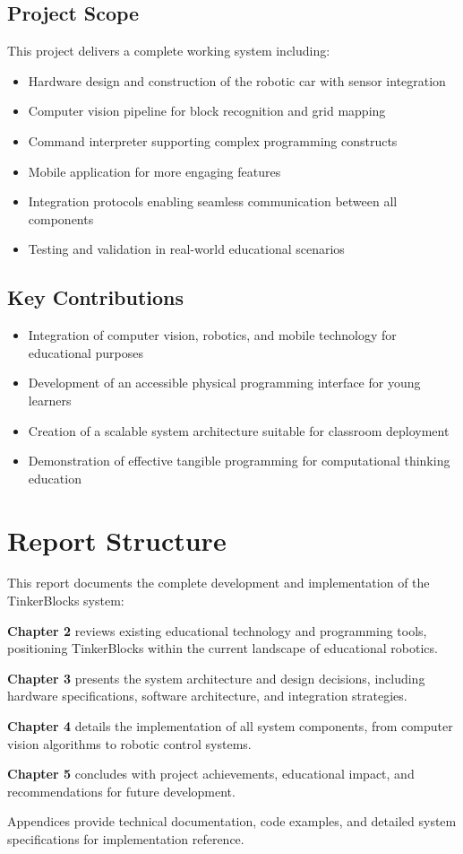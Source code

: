\subsection{Project Scope}
This project delivers a complete working system including:
\begin{itemize}
    \item Hardware design and construction of the robotic car with sensor integration
    \item Computer vision pipeline for block recognition and grid mapping
    \item Command interpreter supporting complex programming constructs
    \item Mobile application for more engaging features
    \item Integration protocols enabling seamless communication between all components
    \item Testing and validation in real-world educational scenarios
\end{itemize}

\subsection{Key Contributions}
\begin{itemize}
    \item Integration of computer vision, robotics, and mobile technology for educational purposes
    \item Development of an accessible physical programming interface for young learners
    \item Creation of a scalable system architecture suitable for classroom deployment
    \item Demonstration of effective tangible programming for computational thinking education
\end{itemize}

\section{Report Structure}

This report documents the complete development and implementation of the TinkerBlocks system:

\textbf{Chapter 2} reviews existing educational technology and programming tools, positioning TinkerBlocks within the current landscape of educational robotics.

\textbf{Chapter 3} presents the system architecture and design decisions, including hardware specifications, software architecture, and integration strategies.

\textbf{Chapter 4} details the implementation of all system components, from computer vision algorithms to robotic control systems.

\textbf{Chapter 5} concludes with project achievements, educational impact, and recommendations for future development.

Appendices provide technical documentation, code examples, and detailed system specifications for implementation reference.